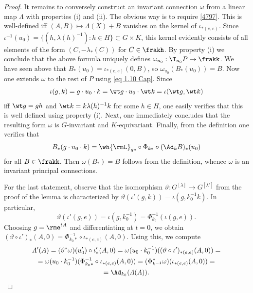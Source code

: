 \begin{proof}
    It remains to conversely construct an invariant connection $\omega$ from a linear map $\varLambda$ with properties (i) and (ii). The obvious way is to require \eqref{4797}. This is well-defined iff $(A,B)\mapsto \varLambda(X)+B$ vanishes on the kernel of $\iota_{\ast(e,e)}$. Since $\iota^{-1}(u_0)=\{(h,\lambda(h)^{-1}):h\in H\}\subset G\times K$, this kernel evidently consists of all elements of the form $(C,-\lambda_\ast(C))$ for $C\in \frakh$. By property (i) we conclude that the above formula uniquely defines $\omega_{u_0}:\T_{u_0}P\to \frakk$. We have seen above that $B_\ast(u_0)=\iota_{\ast(e,e)}(0,B)$, so $\omega_{u_0}(B_\ast(u_0))=B$. Now one extends $\omega$ to the rest of $P$ using \eqref{eq 1.10 Cap}. Since 
    \[\iota(g,k)=g\cdot u_0\cdot k=\wt g\cdot u_0\cdot \wt k=\iota(\wt g,\wt k)\]
    iff $\wt g=gh$ and $\wt k =k\lambda(h)^{-1}k$ for some $h\in H$, one easily verifies that this is well defined using property (i). Next, one immediately concludes that the resulting form $\omega$ is $G$-invariant and $K$-equivariant. Finally, from the definition one verifies that 
    \[B_\ast(g\cdot u_0\cdot k)=\wh{\rmL}_{g\ast}\circ \Phi_{k\ast}\circ (\Ad_k B)_\ast(u_0)\]
    for all $B\in\frakk$. Then $\omega(B_\ast)=B$ follows from the definition, whence $\omega$ is an invariant principal connections.

    For the last statement, observe that the isomorphism $\vartheta:G^{[\lambda]}\to G^{[\lambda']}$ from the proof of the lemma is characterized by $\vartheta(\iota'(g,k))=\iota(g,k_0^{-1}k)$. In particular, 
    \[\vartheta(\iota'(g,e))=\iota(g,k_0^{-1})=\Phi_{k_0}^{-1}(\iota(g,e)).\]
    Choosing $g=\rme^{tA}$ and differentiating at $t=0$, we obtain $(\vartheta\circ \iota')_\ast(A,0)=\Phi_{k_0\ast}^{-1}\circ \iota_{\ast(e,e)}(A,0)$. Using this, we compute 
    \begin{multline}
        \varLambda'(A)=(\vartheta^\ast \omega)(u_0')\circ \iota'_\ast(A,0)=\omega(u_0\cdot k_0^{-1})((\vartheta\circ \iota')_{\ast(e,e)}(A,0))=\\
        =\omega(u_0\cdot k_0^{-1})(\Phi_{k_0\ast}^{-1}\circ \iota_{\ast(e,e)}(A,0))=(\Phi_{k^{-1}}^\ast\omega)(\iota_{\ast(e,e)}(A,0))=\\
        =\Ad_{k_0}(\varLambda(A)).
    \end{multline}
\end{proof}

